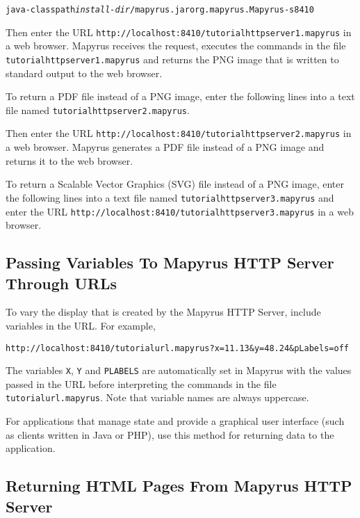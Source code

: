 \begin{alltt}
java -classpath \textit{install-dir}/mapyrus.jar org.mapyrus.Mapyrus -s 8410
\end{alltt}

Then enter the URL \texttt{http://localhost:8410/tutorialhttpserver1.mapyrus} in a
web browser.  Mapyrus receives the request, executes the commands in the file
\texttt{tutorialhttpserver1.mapyrus} and returns the PNG image that is written to
standard output to the web browser.

To return a PDF file instead of a PNG image,
enter the following lines into a text file named
\texttt{tutorialhttpserver2.mapyrus}.



Then enter the URL \texttt{http://localhost:8410/tutorialhttpserver2.mapyrus}
in a web browser.  Mapyrus generates a PDF file instead of a PNG image and
returns it to the web browser.

To return a Scalable Vector Graphics (SVG) file instead of a PNG image,
enter the following lines into a text file named
\texttt{tutorialhttpserver3.mapyrus} and enter the URL
\texttt{http://localhost:8410/tutorialhttpserver3.mapyrus}
in a web browser.



\subsection{Passing Variables To Mapyrus HTTP Server Through URLs}
\label{urlvariables}

To vary the display that is created by the Mapyrus HTTP Server, include
variables in the URL.  For example,

\begin{verbatim}
http://localhost:8410/tutorialurl.mapyrus?x=11.13&y=48.24&pLabels=off
\end{verbatim}

The variables \texttt{X}, \texttt{Y}
and \texttt{PLABELS} are automatically set in Mapyrus with the values
passed in the URL before interpreting
the commands in the file \texttt{tutorialurl.mapyrus}.
Note that variable names are always uppercase.

For applications that manage state
and provide a graphical user interface (such as clients written in
Java or PHP), use this method for returning data to the
application.

\subsection{Returning HTML Pages From Mapyrus HTTP Server}

